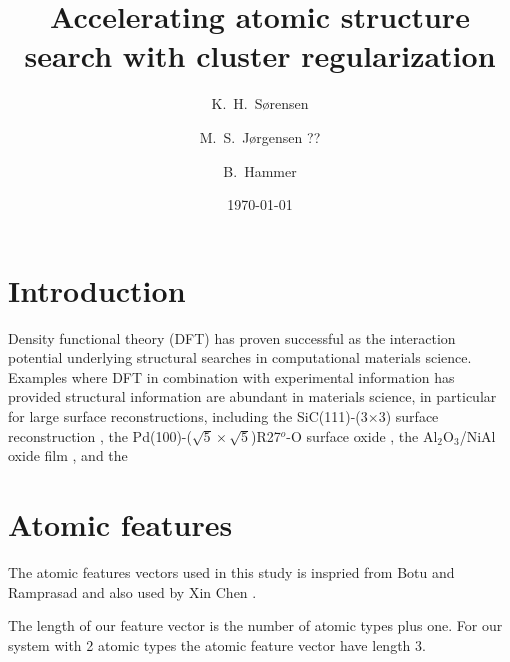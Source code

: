 \documentclass[%
 aps,
 prl,%
 amsmath,amssymb,
 reprint,%
]{revtex4-1}
\begin{document}
\title[]{Accelerating atomic structure search with cluster regularization}%

\author{K.\ H.\ S{\o}rensen}
\author{M.\ S.\ J{\o}rgensen ??}
\author{B.\ Hammer}
 
\date{\today}%

\begin{abstract}
\end{abstract}

\keywords{}%
\maketitle

\section{\label{sec:introduction}Introduction}
Density functional theory (DFT) has proven successful as the
interaction potential underlying structural searches in computational
materials science. Examples where DFT in combination with experimental information
has provided structural information are abundant in materials science, in particular
for large surface reconstructions, including the SiC(111)-(3$\times$3) surface reconstruction \cite{Starke1998}, the Pd(100)-($\sqrt{5}\times \sqrt{5}$)R27$^o$-O surface oxide \cite{Todorova2003}, the Al$_2$O$_3$/NiAl oxide film \cite{Kresse2005}, and the


\section{Atomic features}
 
The atomic features vectors used in this study is inspried from Botu and Ramprasad \cite{Boto2015} and also used by Xin Chen \cite{Chen2017}.

The length of our feature vector is the number of atomic types plus one. For our system with 2 atomic types the atomic feature vector have length 3.
\end{document}
